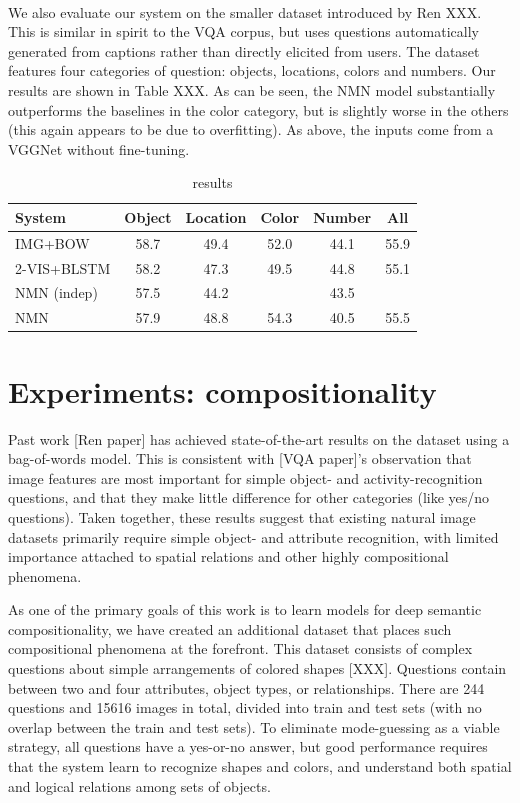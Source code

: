 \paragraph{\cocoqa}
We also evaluate our system on the smaller \cocoqa dataset introduced by Ren
XXX. This is similar in spirit to the VQA corpus, but uses questions
automatically generated from captions rather than directly elicited from users.
The \cocoqa dataset features four categories of question: objects, locations,
colors and numbers. Our results are shown in Table XXX. As can be seen, the NMN
model substantially outperforms the baselines in the color category, but is
slightly worse in the others (this again appears to be due to overfitting).
As above, the inputs come from a VGGNet without fine-tuning.

\begin{table}
  \footnotesize
  \center
  \begin{tabular}{lccccc}
    \toprule
    System & Object & Location & Color & Number & All \\
    \midrule
    IMG+BOW & 58.7 & 49.4 & 52.0 & 44.1 & 55.9 \\
    2-VIS+BLSTM & 58.2 & 47.3 & 49.5 & 44.8 & 55.1 \\
    NMN (indep) & 57.5 & 44.2 & & 43.5 & \\
    NMN & 57.9 & 48.8 & 54.3 & 40.5 & 55.5 \\
    \bottomrule
  \end{tabular}
  \caption{\cocoqa results}
\end{table}

\section{Experiments: compositionality}

Past work [Ren paper] has achieved state-of-the-art results on the \cocoqa
dataset using a bag-of-words model. This is consistent with [VQA paper]'s
observation that image features are most important for simple object- and
activity-recognition questions, and that they make little difference for other
categories (like yes/no questions). Taken together, these results suggest that
existing natural image datasets primarily require simple object- and attribute
recognition, with limited importance attached to spatial relations and other
highly compositional phenomena.

As one of the primary goals of this work is to learn models for deep semantic
compositionality, we have created an additional dataset that places such
compositional phenomena at the forefront. This dataset consists of complex
questions about simple arrangements of colored shapes [XXX].  Questions contain
between two and four attributes, object types, or relationships.  There are 244
questions and 15616 images in total, divided into train and test sets (with no
overlap between the train and test sets).  To eliminate mode-guessing as a
viable strategy, all questions have a yes-or-no answer, but good performance
requires that the system learn to recognize shapes and colors, and understand
both spatial and logical relations among sets of objects.

